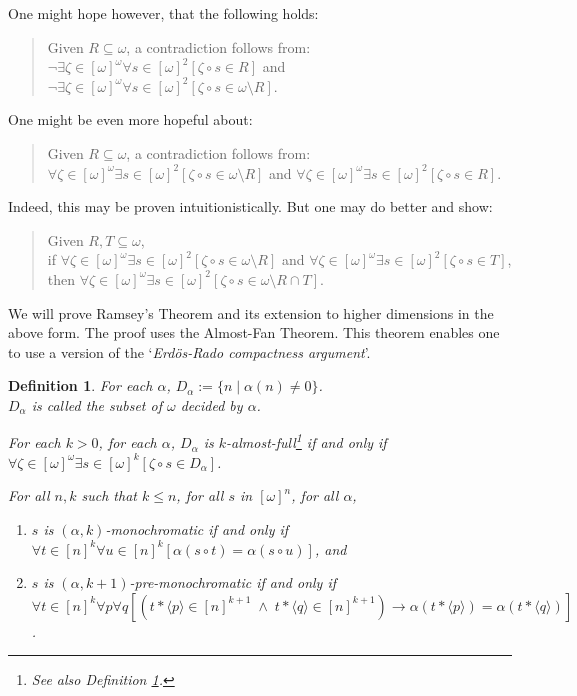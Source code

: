 \documentclass[a4paper]{amsart}
\theoremstyle{plain}
\newtheorem{definition}{Definition}
\begin{document}
 \smallskip One might hope however, that the following holds: 
 
 \begin{quote} Given $R\subseteq \omega$, a contradiction follows from: \\$\neg\exists \zeta\in[\omega]^\omega\forall s \in [\omega]^2[\zeta\circ s \in R]$ and $\neg\exists \zeta\in[\omega]^\omega\forall s \in [\omega]^2[\zeta\circ s \in \omega\setminus R]$. 
 \end{quote}
 
 One might be even more hopeful about: \begin{quote} Given $R\subseteq \omega$, a contradiction follows from: \\$\forall \zeta\in[\omega]^\omega\exists s \in [\omega]^2[\zeta\circ s \in \omega\setminus R]$ and $\forall \zeta\in[\omega]^\omega\exists s \in [\omega]^2[\zeta\circ s \in  R]$. 
 \end{quote}
 
 Indeed, this may be proven intuitionistically. But one may do better and show: 
 
 \begin{quote} Given $R, T\subseteq \omega$, \\ if $\forall \zeta\in[\omega]^\omega\exists s \in [\omega]^2[\zeta\circ s \in \omega\setminus R]$ and $\forall \zeta\in[\omega]^\omega\exists s \in [\omega]^2[\zeta\circ s \in  T]$, \\then $\forall \zeta\in[\omega]^\omega\exists s \in [\omega]^2[\zeta\circ s \in \omega\setminus R\cap T]$.
 \end{quote}
 
 We will prove Ramsey's Theorem and its extension to higher dimensions in the above form. The proof uses the Almost-Fan Theorem. This theorem enables one to use a version of the `\textit{Erd\"os-Rado compactness argument}'.
\begin{definition}\label{D:almostfull} For each $\alpha$, $D_\alpha:=\{n\mid\alpha(n)\neq 0\}$. \\$D_\alpha$ is called \emph{the subset of $\omega$ decided by $\alpha$}. 

For each $k>0$, for each $\alpha$, $D_\alpha$ is  \emph{$k$-almost-full}\footnote{See also Definition \ref{D:almostfull}.} if and only if \\$\forall \zeta \in [\omega]^\omega\exists s \in [\omega]^k[\zeta\circ s \in D_\alpha]$. 

\smallskip For all $n,k$ such that $k\le n$, for all $s$ in $[\omega]^n$, for all $\alpha$, \begin{enumerate} \item $s$ is \emph{$(\alpha, k)$-monochromatic} if and only if \\$\forall t \in [n]^k\forall u \in [n]^k[\alpha(s\circ t)=\alpha(s\circ u)]$, and \item $s$ is \emph{$(\alpha, k+1)$-pre-monochromatic} if and only if \\$\forall t \in [n]^k\forall p \forall q[(t\ast\langle p \rangle \in [n]^{k+1} \;\wedge\; t\ast\langle q \rangle \in [n]^{k+1})\rightarrow \alpha(t\ast\langle p \rangle)=\alpha(t\ast\langle q \rangle)
]$.\end{enumerate} \end{definition}
\end{document}
